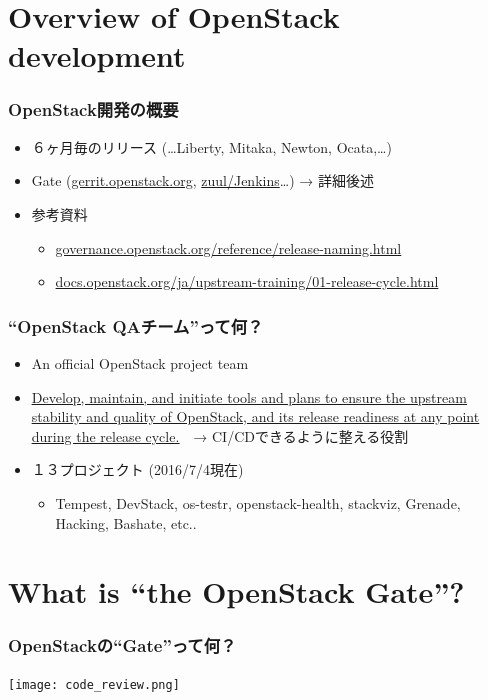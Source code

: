 \documentclass[aspectratio=169,11pt,hyperref={colorlinks=true}]{beamer}
\begin{document}
\section{Overview of OpenStack development}
\begin{frame}
    \frametitle{OpenStack開発の概要}
    \begin{itemize}
        \item ６ヶ月毎のリリース (\ldots Liberty, Mitaka, Newton, Ocata,\ldots)
        \item Gate (\href{https://gerrit.openstack.org}{gerrit.openstack.org},
          \href{http://zuul.openstack.org/}{zuul/Jenkins}\ldots) → 詳細後述
        \item 参考資料
          \begin{itemize}
            \item \href{http://governance.openstack.org/reference/release-naming.html}{governance.openstack.org/reference/release-naming.html}
            \item \href{http://docs.openstack.org/ja/upstream-training/01-release-cycle.html}{docs.openstack.org/ja/upstream-training/01-release-cycle.html}
          \end{itemize}
    \end{itemize}
\end{frame}

\begin{frame}
    \frametitle{``OpenStack QAチーム''って何？}
    \begin{itemize}
        \item An official OpenStack project team
        \item \href{https://wiki.openstack.org/wiki/QA}{\ul{Develop, maintain,
          and initiate tools and plans to ensure the upstream stability
          and quality of OpenStack, and its release readiness at any point
          during the release cycle.}}　→ CI/CDできるように整える役割
        \item １３プロジェクト (2016/7/4現在)
        \begin{itemize}
          \item Tempest, DevStack, os-testr, openstack-health, stackviz, Grenade, Hacking, Bashate, etc..
        \end{itemize}
    \end{itemize}
\end{frame}

\section{What is ``the OpenStack Gate''?}
\begin{frame}
  \frametitle{OpenStackの``Gate''って何？}
  \begin{center}
    \texttt{[image: code\_review.png]}
  \end{center}
\end{frame}
\end{document}
